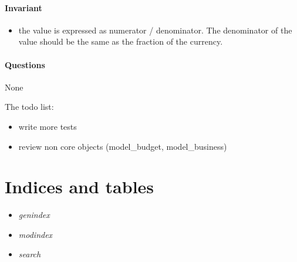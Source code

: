 \documentclass[letterpaper,10pt,english]{sphinxmanual}
\begin{document}
\subsubsection{Invariant}
\label{object_model:id10}\begin{itemize}
\item {} 
the value is expressed as numerator / denominator. The denominator of the value should be
the same as the fraction of the currency.

\end{itemize}


\subsubsection{Questions}
\label{object_model:id11}
None

The todo list:
\begin{itemize}
\item {} 
write more tests

\item {} 
review non core objects (model\_budget, model\_business)

\end{itemize}


\chapter{Indices and tables}
\label{index:indices-and-tables}\begin{itemize}
\item {} 
\emph{genindex}

\item {} 
\emph{modindex}

\item {} 
\emph{search}

\end{itemize}
\end{document}
